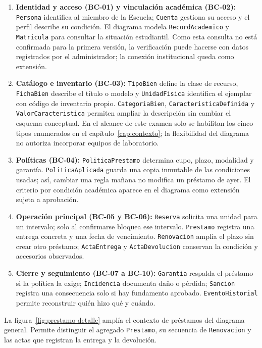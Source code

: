 \begin{enumerate}
    \item \textbf{Identidad y acceso (BC-01) y vinculaci\'on acad\'emica (BC-02):} \texttt{Persona} identifica al miembro de la Escuela; \texttt{Cuenta} gestiona su acceso y el perfil describe su condici\'on. El diagrama modela \texttt{RecordAcademico} y \texttt{Matricula} para consultar la situaci\'on estudiantil. Como esta consulta no est\'a confirmada para la primera versi\'on, la verificaci\'on puede hacerse con datos registrados por el administrador; la conexi\'on institucional queda como extensi\'on.
    \item \textbf{Cat\'alogo e inventario (BC-03):} \texttt{TipoBien} define la clase de recurso, \texttt{FichaBien} describe el t\'itulo o modelo y \texttt{UnidadFisica} identifica el ejemplar con c\'odigo de inventario propio. \texttt{CategoriaBien}, \texttt{CaracteristicaDefinida} y \texttt{ValorCaracteristica} permiten ampliar la descripci\'on sin cambiar el esquema conceptual. En el alcance de este examen solo se habilitan los cinco tipos enumerados en el cap\'itulo~\ref{cap:contexto}; la flexibilidad del diagrama no autoriza incorporar equipos de laboratorio.
    \item \textbf{Pol\'iticas (BC-04):} \texttt{PoliticaPrestamo} determina cupo, plazo, modalidad y garant\'ia. \texttt{PoliticaAplicada} guarda una copia inmutable de las condiciones usadas; as\'i, cambiar una regla ma\~nana no modifica un pr\'estamo de ayer. El criterio por condici\'on acad\'emica aparece en el diagrama como extensi\'on sujeta a aprobaci\'on.
    \item \textbf{Operaci\'on principal (BC-05 y BC-06):} \texttt{Reserva} solicita una unidad para un intervalo; solo al confirmarse bloquea ese intervalo. \texttt{Prestamo} registra una entrega concreta y una fecha de vencimiento. \texttt{Renovacion} ampl\'ia el plazo sin crear otro pr\'estamo; \texttt{ActaEntrega} y \texttt{ActaDevolucion} conservan la condici\'on y accesorios observados.
    \item \textbf{Cierre y seguimiento (BC-07 a BC-10):} \texttt{Garantia} respalda el pr\'estamo si la pol\'itica la exige; \texttt{Incidencia} documenta da\~no o p\'erdida; \texttt{Sancion} registra una consecuencia solo si hay fundamento aprobado. \texttt{EventoHistorial} permite reconstruir qui\'en hizo qu\'e y cu\'ando.
\end{enumerate}

La figura~\ref{fig:prestamo-detalle} ampl\'ia el contexto de pr\'estamos del diagrama general. Permite distinguir el agregado \texttt{Prestamo}, su secuencia de \texttt{Renovacion} y las actas que registran la entrega y la devoluci\'on.

